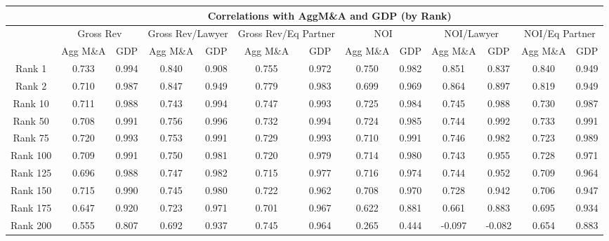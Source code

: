\documentclass{article}
\begin{document}
                    \begin{table}[H]
\centering
\begin{tabular}{ccccccccccccc}

                    \multirow{2}{*}{} & \multicolumn{12}{c}{\textbf{Correlations with AggM\&A and GDP (by Rank)}} \\
                    \hline
                    & \multicolumn{2}{c}{Gross Rev} & \multicolumn{2}{c}{Gross Rev/Lawyer} & \multicolumn{2}{c}{Gross Rev/Eq Partner} & \multicolumn{2}{c}{NOI}& \multicolumn{2}{c}{NOI/Lawyer}& \multicolumn{2}{c}{NOI/Eq Partner}\\
                    \cline{2-13}
                    & Agg M\&A & GDP & Agg M\&A & GDP & Agg M\&A & GDP & Agg M\&A & GDP & Agg M\&A & GDP & Agg M\&A & GDP\\
                    \hline

Rank 1 & 0.733 & 0.994 & 0.840 & 0.908 & 0.755 & 0.972 & 0.750 & 0.982 & 0.851 & 0.837 & 0.840 & 0.949 \\
  Rank 2 & 0.710 & 0.987 & 0.847 & 0.949 & 0.779 & 0.983 & 0.699 & 0.969 & 0.864 & 0.897 & 0.819 & 0.949 \\
  Rank 10 & 0.711 & 0.988 & 0.743 & 0.994 & 0.747 & 0.993 & 0.725 & 0.984 & 0.745 & 0.988 & 0.730 & 0.987 \\
  Rank 50 & 0.708 & 0.991 & 0.756 & 0.996 & 0.732 & 0.994 & 0.724 & 0.985 & 0.744 & 0.992 & 0.733 & 0.991 \\
  Rank 75 & 0.720 & 0.993 & 0.753 & 0.991 & 0.729 & 0.993 & 0.710 & 0.991 & 0.746 & 0.982 & 0.723 & 0.989 \\
  Rank 100 & 0.709 & 0.991 & 0.750 & 0.981 & 0.720 & 0.979 & 0.714 & 0.980 & 0.743 & 0.955 & 0.728 & 0.971 \\
  Rank 125 & 0.696 & 0.988 & 0.747 & 0.982 & 0.715 & 0.977 & 0.716 & 0.974 & 0.744 & 0.952 & 0.709 & 0.964 \\
  Rank 150 & 0.715 & 0.990 & 0.745 & 0.980 & 0.722 & 0.962 & 0.708 & 0.970 & 0.728 & 0.942 & 0.706 & 0.947 \\
  Rank 175 & 0.647 & 0.920 & 0.723 & 0.971 & 0.701 & 0.967 & 0.622 & 0.881 & 0.661 & 0.883 & 0.695 & 0.934 \\
  Rank 200 & 0.555 & 0.807 & 0.692 & 0.937 & 0.745 & 0.964 & 0.265 & 0.444 & -0.097 & -0.082 & 0.654 & 0.883 \\
   \hline
\end{tabular}
\end{table}
\end{document}
